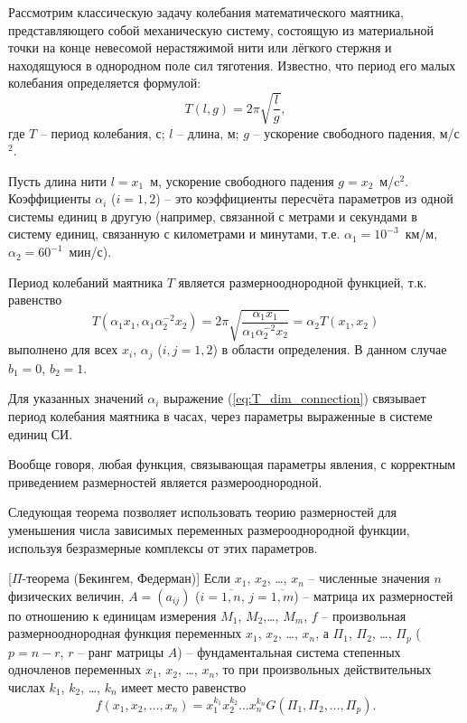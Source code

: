 \documentclass[14pt]{extarticle}
\begin{document}
Рассмотрим классическую задачу колебания математического маятника, представляющего собой механическую систему, состоящую из материальной точки на конце невесомой нерастяжимой нити или лёгкого стержня и находящуюся в однородном поле сил тяготения. Известно, что период его \alert{малых} колебания определяется формулой:
\[
T(l, g) = 2 \pi \sqrt{\frac{l}{g}},
\]
где $T$ -- период колебания, с; $l$ -- длина, м; $g$ -- ускорение свободного падения, м/с$^2$.

Пусть длина нити $l = x_1$~м, ускорение свободного падения $g = x_2$~м/c$^2$. Коэффициенты $\alpha_i$ ($i=1,2$) -- это коэффициенты пересчёта параметров из одной системы единиц в другую (например, связанной с метрами и секундами в систему единиц, связанную с километрами и минутами, т.е. $\alpha_1 = 10^{-3}$~км/м, $\alpha_2 = 60^{-1}$~мин/с).

Период колебаний маятника $T$ является размернооднородной функцией, т.к. равенство
\begin{equation}
\label{eq:T_dim_connection}
T(\alpha_1 x_1, \alpha_1 \alpha_2^{-2} x_2) = 2 \pi \sqrt{\frac{\alpha_1 x_1}{\alpha_1 \alpha_2^{-2} x_2}} = \alpha_2 T(x_1, x_2)
\end{equation}
выполнено для всех $x_i$, $\alpha_j$ ($i,j=1,2$) в области определения. В данном случае $b_1 = 0$, $b_2 = 1$. 

Для указанных значений $\alpha_i$ выражение (\ref{eq:T_dim_connection}) связывает период колебания маятника в часах, через параметры выраженные в системе единиц СИ.

Вообще говоря, любая функция, связывающая параметры явления, с корректным приведением размерностей является размерооднородной.


Следующая теорема позволяет использовать теорию размерностей для уменьшения числа зависимых переменных размерооднородной функции, используя безразмерные комплексы от этих параметров.


\begin{theorems}{[$\Pi$-теорема (Бекингем, Федерман)]}
\label{thm:pi_theorem}
Если $x_1$, $x_2$, \ldots, $x_n$ -- численные значения $n$ физических величин, $A=(a_{ij})$ ($i=\overline{1,n}$, $j=\overline{1,m}$) -- матрица их размерностей по отношению к единицам измерения $M_1$, $M_2$,\ldots, $M_m$, $f$ -- произвольная размернооднородная функция переменных  $x_1$, $x_2$, \ldots, $x_n$, а $\Pi_1$, $\Pi_2$, \ldots, $\Pi_p$ ($p=n-r$, $r$ -- ранг матрицы $A$) -- фундаментальная система степенных одночленов переменных $x_1$, $x_2$, \ldots, $x_n$, то при произвольных действительных числах $k_1$, $k_2$, \ldots, $k_n$ имеет место равенство
\[
f(x_1, x_2, \ldots, x_n) = x_1^{k_1} x_2^{k_2} \ldots x_n^{k_n}
G(\Pi_1, \Pi_2, \ldots, \Pi_p).
\]
\end{theorems}
\end{document}
